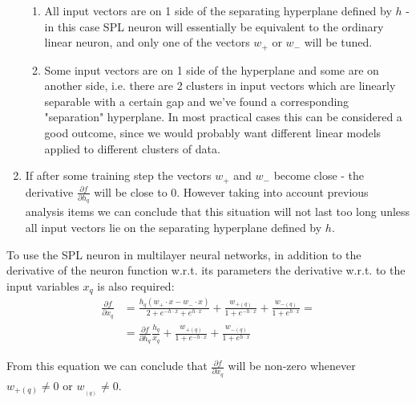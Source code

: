 \documentclass[sn-apa]{sn-jnl}%
\begin{document}
\begin{enumerate}
\begin{enumerate}
\item All input vectors are on 1 side of the separating hyperplane defined by $h$ - in this case SPL neuron will essentially be equivalent to the ordinary linear neuron, and only one of the vectors $w_+$ or $w_-$ will be tuned.
\item Some input vectors are on 1 side of the hyperplane and some are on another side, i.e. there are 2 clusters in input vectors which are linearly separable with a certain gap and we've found a corresponding "separation" hyperplane. In most practical cases this can be considered a good outcome, since we would probably want different linear models applied to different clusters of data. 
\end{enumerate}
\item If after some training step the vectors $w_+$ and $w_-$ become close - the derivative $\frac{\partial f}{\partial h_q}$ will be close to 0. However taking into account previous analysis items we can conclude that this situation will not last too long unless all input vectors lie on the separating hyperplane defined by $h$.
\end{enumerate}
  
 To use the SPL neuron in multilayer neural networks, in addition to the derivative of the neuron function w.r.t. its parameters the derivative w.r.t. to the input variables $x_q$ is also required:
 \begin{align}
\frac{\partial f}{\partial x_q} &= \frac{h_q(w_+ \cdot x - w_- \cdot x)}
	{2+e^{-h \cdot x} + e^{h \cdot x}} + \frac{w_{+(q)}}{1 + e^{-h \cdot x}} +
	\frac{w_{-(q)}}{1 + e^{h \cdot x}} = \nonumber \\
&= \frac{\partial f}{\partial h_q}\frac{h_q}{x_q} + \frac{w_{+(q)}}{1 + e^{-h \cdot x}}
	+ \frac{w_{-(q)}}{1 + e^{h \cdot x}} \label{eq17}
\end{align} 
 
 From this equation we can conclude that $\frac{\partial f}{\partial x_q}$ will be non-zero whenever $w_{+(q)} \ne 0 $ or $w_{_(q)} \ne 0$. 
\end{document}
